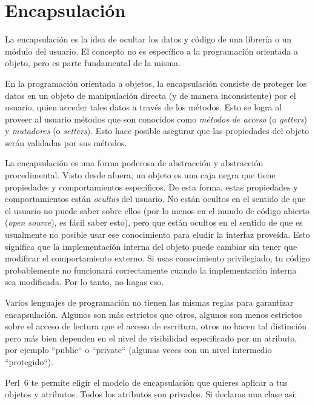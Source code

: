 \section{Encapsulación}

La encapsulación es la idea de ocultar los datos y código 
de una librería o un módulo del usuario. El concepto no es
específico a la programación orientada a objeto, pero 
es parte fundamental de la misma.

En la programación orientada a objetos, la encapsulación 
consiste de proteger los datos en un objeto de manipulación
directa (y de manera inconsistente) por el usuario, quien 
acceder tales datos a través de los métodos. Esto se logra al
proveer al usuario métodos que son conocidos como \emph{métodos 
de acceso} (o \emph{getters}) y \emph{mutadores} (o \emph{setters}).
Esto hace posible asegurar que las propiedades del objeto 
serán validadas por sus métodos. 


La encapsulación es una forma poderosa de abstracción
y abstracción procedimental. Visto desde afuera, un
objeto es una caja negra que tiene propiedades y 
comportamientos específicos. De esta forma, estas propiedades
y comportamientos están \emph{ocultos} del usuario. 
No están ocultos en el sentido de que el usuario no puede
saber sobre ellos (por lo menos en el mundo de código 
abierto (\emph{open source}), es fácil saber esto), pero
que están ocultos en el sentido de que es usualmente no posible
usar ese conocimiento para eludir la interfaz proveída.
Esto significa que la implementación interna del objeto 
puede cambiar sin tener que modificar el comportamiento
externo. Si usas conocimiento privilegiado, tu código
probablemente no funcionará correctamente cuando la 
implementación interna sea modificada. Por lo tanto,
no hagas eso.

Varios lenguajes de programación no tienen las mismas reglas para
garantizar encapsulación. Algunos son más estrictos que otros,
algunos son menos estrictos sobre el acceso de lectura que el
acceso de escritura, otros no hacen tal distinción pero más bien
dependen en el nivel de visibilidad especificado por un atributo,
por ejemplo ``public`` o ``private`` (algunas veces con un nivel 
intermedio ``protegido``).

Perl~6 te permite eligir el modelo de encapsulación que quieres
aplicar a tus objetos y atributos. Todos los atributos son 
privados. Si declaras una clase así:

